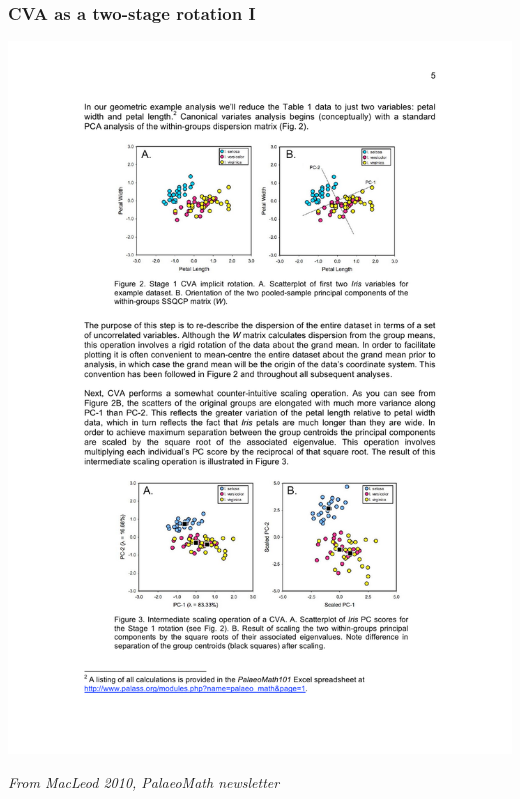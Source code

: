 \documentclass{beamer}
\begin{document}
\begin{frame}
  \frametitle{CVA as a two-stage rotation I}
  
\begin{center}
\includegraphics[width=\textwidth]{cva-as-rot1}
\end{center}

\hfill {\scriptsize \textit{From MacLeod 2010, PalaeoMath newsletter}}

\end{frame}
\end{document}

